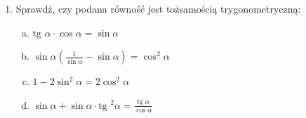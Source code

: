 \documentclass[12pt,a4paper]{article}
\begin{document}
\begin{enumerate}[1.]
		\item Sprawdź, czy podana równość jest tożsamością trygonometryczną:
		
		\begin{enumerate}[a)]
			\item $\text{tg }\alpha\cdot\cos\alpha=\sin\alpha$
			\item $\sin\alpha(\frac{1}{\sin\alpha}-\sin\alpha)=\cos^2\alpha$
			\item $1-2\sin^2\alpha=2\cos^2\alpha$
			\item $\sin\alpha+\sin\alpha\cdot\text{tg }^2\alpha=\frac{\text{tg }\alpha}{\cos\alpha}$
		\end{enumerate}

	\end{enumerate}
\end{document}
